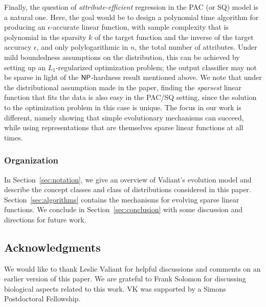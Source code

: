 \documentclass[11pt]{article}
\begin{document}
Finally, the question of \emph{attribute-efficient} regression in the PAC (or
SQ) model is a natural one. Here, the goal would be to design a polynomial time
algorithm for producing an $\epsilon$-accurate linear function, with sample
complexity that is polynomial in the sparsity $k$ of the target function and the
inverse of the target accuracy $\epsilon$, and only polylogarithmic in $n$, the
total number of attributes. Under mild boundedness assumptions on the
distribution, this can be achieved by setting up an $L_1$-regularized
optimization problem; the output classifier may not be sparse in light of the
$\mathsf{NP}$-hardness result mentioned above. We note that under the distributional
assumption made in the paper, finding the \emph{sparsest} linear function that
fits the data is also easy in the PAC/SQ setting, since the solution to the
optimization problem in this case is unique. The focus in our work is different,
namely showing that simple evolutionary mechanisms can succeed, while using
representations that are themselves sparse linear functions at all times.

\subsubsection*{Organization}

In Section~\ref{sec:notation}, we give an overview of Valiant's evolution model
and describe the concept classes and class of distributions considered in this
paper.  Section~\ref{sec:algorithms} contains the mechanisms for evolving sparse
linear functions. We conclude in Section~\ref{sec:conclusion} with some
discussion and directions for future work.

\subsection*{Acknowledgments} 
We would like to thank Leslie Valiant for helpful discussions and comments on an
earlier version of this paper. We are grateful to Frank Solomon for discussing
biological aspects related to this work. VK was supported by a Simons Postdoctoral Fellowship.



\end{document}
